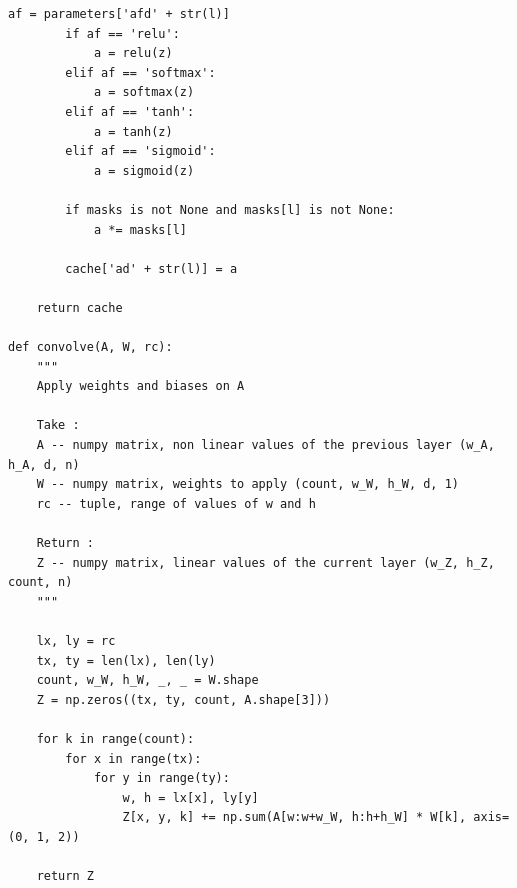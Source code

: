 \documentclass[12pt,a4paper]{extarticle}
\begin{document}
\begin{lstlisting}[mathescape]
        af = parameters['afd' + str(l)]
        if af == 'relu':
            a = relu(z)
        elif af == 'softmax':
            a = softmax(z)
        elif af == 'tanh':
            a = tanh(z)
        elif af == 'sigmoid':
            a = sigmoid(z)

        if masks is not None and masks[l] is not None:
            a *= masks[l]

        cache['ad' + str(l)] = a

    return cache
    
def convolve(A, W, rc):
    """
    Apply weights and biases on A

    Take :
    A -- numpy matrix, non linear values of the previous layer (w_A, h_A, d, n)
    W -- numpy matrix, weights to apply (count, w_W, h_W, d, 1)
    rc -- tuple, range of values of w and h

    Return :
    Z -- numpy matrix, linear values of the current layer (w_Z, h_Z, count, n)
    """

    lx, ly = rc
    tx, ty = len(lx), len(ly)
    count, w_W, h_W, _, _ = W.shape
    Z = np.zeros((tx, ty, count, A.shape[3]))

    for k in range(count):
        for x in range(tx):
            for y in range(ty):
                w, h = lx[x], ly[y]
                Z[x, y, k] += np.sum(A[w:w+w_W, h:h+h_W] * W[k], axis=(0, 1, 2))

    return Z

\end{lstlisting}
\newpage
\end{document}
